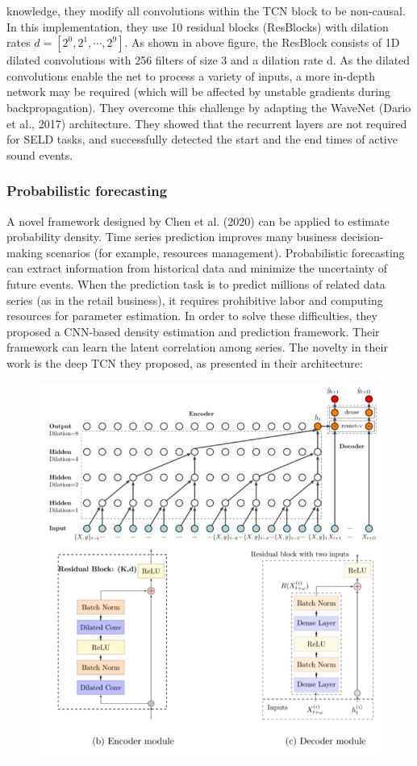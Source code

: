 knowledge, they modify all convolutions within the TCN block to be non-causal. In this implementation, they use 10 residual blocks (ResBlocks) with dilation rates $d = \left[2^0,2^1,\cdots,2^9\right]$. As shown in above figure, the ResBlock consists of 1D dilated convolutions with 256 filters of size 3 and a dilation rate d.
As the dilated convolutions enable the net to process a variety of inputs, a more in-depth network may be required (which will be affected by unstable gradients during backpropagation). They overcome this challenge by adapting the WaveNet (Dario et al., 2017) architecture. They showed that the recurrent layers are not required for SELD tasks, and successfully detected the start and the end times of active sound events.

\subsubsection{Probabilistic forecasting}
A novel framework designed by Chen et al. (2020) can be applied to estimate probability density. Time series prediction improves many business decision-making scenarios (for example, resources management). Probabilistic forecasting can extract information from historical data and minimize the uncertainty of future events. When the prediction task is to predict millions of related data series (as in the retail business), it requires prohibitive labor and computing resources for parameter estimation. In order to solve these difficulties, they proposed a CNN-based density estimation and prediction framework. Their framework can learn the latent correlation among series. The novelty in their work is the deep TCN they proposed, as presented in their architecture:
\begin{figure}[h]
    \includegraphics[width=\textwidth]{../Figures/ch_3_10.png}
\end{figure}
